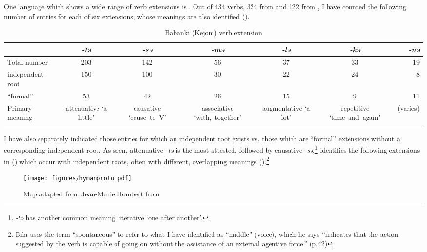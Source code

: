 \documentclass[output=paper]{langsci/langscibook}
\begin{document}
One language which shows a wide range of verb extensions is . Out of 434 verbs, 324 from \citet{Jisa1977} and 122 from \citet{Akumbu2008}, I have counted the following number of entries for each of six extensions, whose meanings are also identified ().

\begin{table}

\begin{tabularx}{\textwidth}{QSSSSSr}
\lsptoprule
& {\textit{-tə}} & { \textit{-sə}} & { \textit{-mə}} & { \textit{-lə}} & {\textit{-kə}} & {\textit{-nə}}\\
\midrule
{Total number} & 203 & 142 & 56 & 37 & 33 & 19\\
{independent root} & 150 & 100 & 30 & 22 & 24 & 8\\
{“formal”} & 53 & 42 & 26 & 15 & 9 & 11\\
  {Primary} \mbox{meaning}&\scriptsize\centering attenuative ‘a little’  &\scriptsize causative {‘cause~to~V’}  &\scriptsize associative \mbox{‘with,~together’} &\scriptsize augmentative ‘a lot’&\scriptsize repetitive  \mbox{‘time and again’}&\scriptsize (varies)\\ 
\lspbottomrule                          
\end{tabularx}
\caption{Babanki (Kejom) verb extension}
\label{extab:proto:9}
\end{table}

\largerpage[2]
\noindent
I have also separately indicated those entries for which an independent root exists vs. those which are “formal” extensions without a corresponding independent root. As seen, attenuative \textit{-tə} is the most attested, followed by causative \textit{-sə}.\footnote{\textit{-tə} has another common meaning: iterative ‘one after another’.} \citet[39-44]{Bila1986} identifies the following extensions in  () which occur with independent roots, often with different, overlapping meanings ().\footnote{Bila uses the term “spontaneous” to refer to what I have identified as “middle” (voice), which he says “indicates that the action suggested by the verb is capable of going on without the assistance of an external agentive force.” (p.42)}\vspace{-5mm}

\begin{figure}[p]
\texttt{[image: figures/hymanproto.pdf]}
\caption{Map adapted from Jean-Marie Hombert from \citet[xii]{Hyman1979ed}}
\label{fig:hyman:map}
\end{figure}
\end{document}
